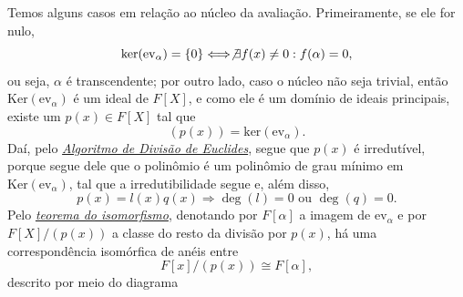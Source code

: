 \documentclass[../algebraIII_notes.tex]{subfiles}
\begin{document}
Temos alguns casos em relação ao núcleo da avaliação. Primeiramente, se ele for nulo,
\[
	\mathrm{ker}(\mathrm{ev}_{\alpha }) = \{0\} \Longleftrightarrow \not\exists f(x)\neq 0: f(\alpha )=0,
\]
ou seja, \(\alpha \) é transcendente; por outro lado, caso o núcleo não seja trivial, então \(\mathrm{Ker}(\mathrm{ev}_{\alpha })\) é um ideal de \(F[X]\), e como ele é um domínio de ideais principais, existe um \(p(x)\in F[X]\) tal que
\[
	(p(x))=\mathrm{ker}(\mathrm{ev}_{\alpha }).
\]
Daí, pelo \hyperlink{euclides_algorithm}{\textit{Algoritmo de Divisão de Euclides}}, segue que \(p(x)\) é irredutível, porque segue dele que o polinômio é um polinômio de grau mínimo em \(\mathrm{Ker}(\mathrm{ev}_{\alpha })\), tal que a irredutibilidade segue e, além disso,
\[
	p(x)=l(x)q(x) \Rightarrow \deg{(l)}=0 \text{ ou } \deg{(q)}=0.
\]
Pelo \hyperlink{isomorphism_theorem}{\textit{teorema do isomorfismo}}, denotando por \(F[\alpha ]\) a imagem de \(\mathrm{ev}_{\alpha }\) e por \(F[X]/(p(x))\) a classe do resto da divisão por \(p(x)\), há uma correspondência isomórfica de anéis entre
\[
	F[x]/(p(x))\cong F[\alpha ],
\]
descrito por meio do diagrama
\begin{center}
\end{center}
\end{document}
